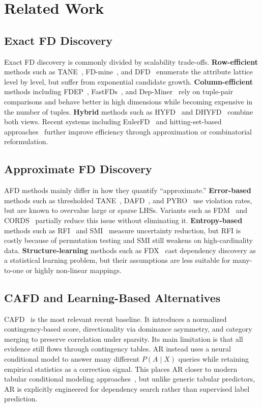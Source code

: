 \documentclass[conference]{IEEEtran}
\begin{document}
\section{Related Work}\label{sec:related}

\subsection{Exact FD Discovery}
Exact FD discovery is commonly divided by scalability trade-offs. \textbf{Row-efficient} methods such as TANE~\cite{tane}, FD-mine~\cite{fdmine}, and DFD~\cite{dfd} enumerate the attribute lattice level by level, but suffer from exponential candidate growth. \textbf{Column-efficient} methods including FDEP~\cite{fdep}, FastFDs~\cite{fastfd}, and Dep-Miner~\cite{depminer} rely on tuple-pair comparisons and behave better in high dimensions while becoming expensive in the number of tuples. \textbf{Hybrid} methods such as HYFD~\cite{hyfd} and DHYFD~\cite{dhyfd} combine both views. Recent systems including EulerFD~\cite{eulerfd} and hitting-set-based approaches~\cite{hittingset} further improve efficiency through approximation or combinatorial reformulation.

\subsection{Approximate FD Discovery}
AFD methods mainly differ in how they quantify ``approximate.'' \textbf{Error-based} methods such as thresholded TANE~\cite{tane}, DAFD~\cite{dafd}, and PYRO~\cite{pyro} use violation rates, but are known to overvalue large or sparse LHSs. Variants such as FDM~\cite{fdm} and CORDS~\cite{cords} partially reduce this issue without eliminating it. \textbf{Entropy-based} methods such as RFI~\cite{rfi} and SMI~\cite{smi} measure uncertainty reduction, but RFI is costly because of permutation testing and SMI still weakens on high-cardinality data. \textbf{Structure-learning} methods such as FDX~\cite{fdx} cast dependency discovery as a statistical learning problem, but their assumptions are less suitable for many-to-one or highly non-linear mappings.

\subsection{CAFD and Learning-Based Alternatives}
CAFD~\cite{cafdui} is the most relevant recent baseline. It introduces a normalized contingency-based score, directionality via dominance asymmetry, and category merging to preserve correlation under sparsity. Its main limitation is that all evidence still flows through contingency tables. AR instead uses a neural conditional model to answer many different $P(A \mid X)$ queries while retaining empirical statistics as a correction signal. This places AR closer to modern tabular conditional modeling approaches~\cite{tabnet,tabtransformer}, but unlike generic tabular predictors, AR is explicitly engineered for dependency search rather than supervised label prediction.
\end{document}
